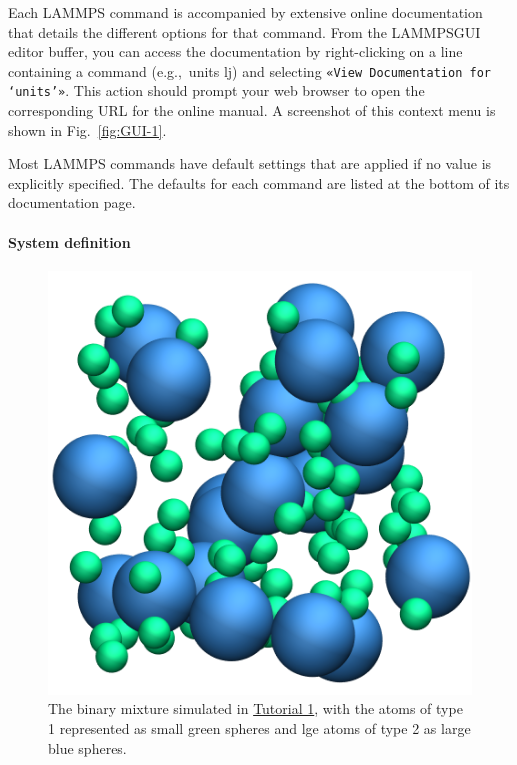 \documentclass[9pt,tutorial]{livecoms}
\newcommand{\lmpcmd}[1]{\hspace{0pt}\colorbox{listing}{\textcolor{command}{\small{#1}}}\hspace{0pt}} %
\newcommand{\guicmd}[1]{\textcolor{command}{\texttt{«#1»}}} %
\newcommand{\lammpsgui}{\textsf{LAMMPS\textendash GUI}}
\begin{document}
\begin{note}
    Each LAMMPS command is accompanied by extensive online documentation
    that details the different options for that command.  From the
    \lammpsgui{} editor buffer, you can access the documentation by
    right-clicking on a line containing a command (e.g.,~\lmpcmd{units lj})
    and selecting \guicmd{View Documentation for `units'}.  This action
    should prompt your web browser to open the corresponding URL for the
    online manual.  A screenshot of this context menu is shown in
    Fig.~\ref{fig:GUI-1}.
\end{note}

\begin{note}
    {\color{blue}Most LAMMPS commands have default settings that are applied if no value
    is explicitly specified.  The defaults for each command are listed at the
    bottom of its documentation page.}
\end{note}

\paragraph{System definition}

\begin{figure}
\centering
\includegraphics[width=0.55\linewidth]{LJ-avatar}
\caption{The binary mixture simulated in
  \hyperref[lennard-jones-label]{Tutorial 1}, with the atoms of type 1
  represented as small green spheres and lge atoms of type 2 as large
  blue spheres.}
\label{fig:LJ-avatar}
\end{figure}
\end{document}
